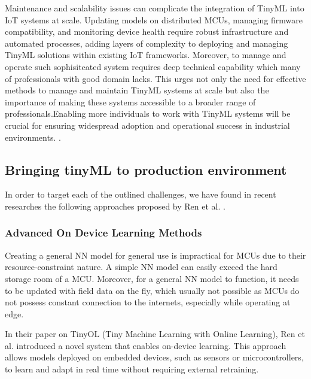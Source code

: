 \documentclass[twocolumn]{article}
\begin{document}
Maintenance and scalability issues can complicate the integration of TinyML into IoT systems at scale. Updating models on distributed MCUs, managing firmware compatibility, and monitoring device health require robust infrastructure and automated processes, adding layers of complexity to deploying and managing TinyML solutions within existing IoT frameworks. Moreover, to manage and operate such sophisitcated system requires deep technical capability which many of professionals with good domain lacks. This urges not only the need for effective methods to manage and maintain TinyML systems at scale but also the importance of making these systems accessible to a broader range of professionals.Enabling more individuals to work with TinyML systems will be crucial for ensuring widespread adoption and operational success in industrial environments. \cite{hussein_original_2024, paul_rethinking_2021, de_prado_robustifying_2020,ren_synergy_2021,roshan_adaptive_2021}.


\subsection{Bringing tinyML to production environment}

In order to target each of the outlined challenges, we have found in recent researches the following approaches proposed by Ren et al. \cite{ren_tinyol_2021, ren_how_2022, ren_device_2024}.

\subsubsection{Advanced On Device Learning Methods}
Creating a general NN model for general use is impractical for MCUs due to their resource-constraint nature. A simple NN model can easily exceed the hard storage room of a MCU. Moreover, for a general NN model to function, it needs to be updated with field data on the fly, which usually not possible as MCUs do not possess constant connection to the internets, especially while operating at edge.

In their paper on TinyOL (Tiny Machine Learning with Online Learning), Ren et al. introduced a novel system that enables on-device learning. This approach allows models deployed on embedded devices, such as sensors or microcontrollers, to learn and adapt in real time without requiring external retraining.
\end{document}
